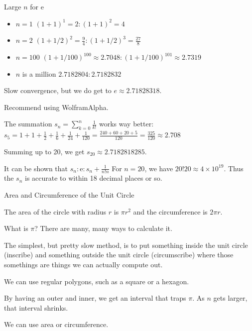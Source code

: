 \documentclass{beamer}
\begin{document}
\begin{frame}{Large $n$  for e}

\begin{itemize}
    \item $n=1$  $(1+1)^1 = 2 : (1+1)^2 = 4$
    \item $n=2$  $(1+1/2)^2 = \frac{9}{4} : (1+1/2)^3 = \frac{27}{8} $
    \item $n=100$  $(1+ 1/100)^{100} \approx 2.7048 : (1+ 1/100)^{101} \approx 2.7319$  
    \item $n$ is a million  $2.7182804:2.7182832$

\end{itemize}

    Slow convergence, but we do get to $e\approx 2.71828318$.

    Recommend using WolframAlpha. 
    
    The summation $s_n = \sum_{k=0}^{n} \frac{1}{k!}$ works way better: $s_5 = 1 + 1 + \frac{1}{2} + \frac{1}{6} + \frac{1}{24} + \frac{1}{120} = \frac{240 + 60 + 20 + 5}{120} = \frac{325}{120} \approx 2.708$

    Summing up to 20, we get $s_{20} \approx 2.7182818285$. 

    It can be shown that  $s_n : \mathrm{e} : s_n + \frac{1}{n!n}$  For $n=20$, we have $20!20 \approx 4\times 10^{19}$. Thus the $s_n$ is accurate to within 18 decimal places or so. 
    
    
\end{frame}


\begin{frame}{Area and Circumference of the Unit Circle}
    
    The area of the circle with radius $r$ is $\pi r^2$ and the circumference is $2 \pi r$.

    What is $\pi$?  There are many, many ways to calculate it. 

    The simplest, but pretty slow method, is to put something inside the unit circle (inscribe) and something outside the unit circle (circumscribe) where those somethings are things we can actually compute out. 

    We can use regular polygons, such as a square or a hexagon. 

    By having an outer and inner, we get an interval that traps $\pi$. As $n$ gets larger, that interval shrinks. 

    We can use area or circumference. 
    
\end{frame}
\end{document}
